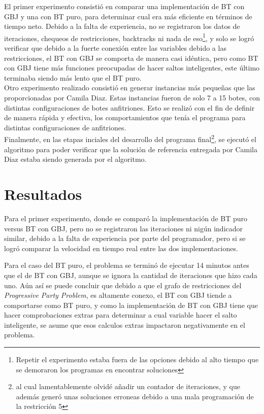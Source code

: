 \documentclass[letter, 10pt]{article}
\begin{document}
El primer experimento consistió en comparar una implementación de BT con GBJ y una con BT puro, para determinar cual era más eficiente en términos de tiempo neto. Debido a la falta de experiencia, no se registraron los datos de iteraciones, chequeos de restricciones, backtracks ni nada de eso\footnote{Repetir el experimento estaba fuera de las opciones debido al alto tiempo que se demoraron los programas en encontrar soluciones}, y solo se logró verificar que debido a la fuerte conexión entre las variables debido a las restricciones, el BT con GBJ se comporta de manera casi idéntica, pero como BT con GBJ tiene más funciones preocupadas de hacer saltos inteligentes, este último terminaba siendo más lento que el BT puro.\\

Otro experimento realizado consistió en generar instancias más pequeñas que las proporcionadas por Camila Diaz. Estas instancias fueron de solo 7 a 15 botes, con distintas configuraciones de botes anfitriones. Esto se realizó con el fin de definir de manera rápida y efectiva, los comportamientos que tenía el programa para distintas configuraciones de anfitriones.\\

Finalmente, en las etapas inciales del desarrollo del programa final\footnote{al cual lamentablemente olvidé añadir un contador de iteraciones, y que además generó unas soluciones erroneas debido a una mala programación de la restricción 5}, se ejecutó el algoritmo para poder verificar que la solución de referencia entregada por Camila Diaz estaba siendo generada por el algoritmo.

\section{Resultados}
Para el primer experimento, donde se comparó la implementación de BT puro versus BT con GBJ, pero no se registraron las iteraciones ni nigún indicador similar, debido a la falta de experiencia por parte del programador, pero si se logró comparar la velocidad en tiempo real entre las dos implementaciones.

Para el caso del BT puro, el problema se terminó de ejecutar 14 minutos antes que el de BT con GBJ, aunque se ignora la cantidad de iteraciones que hizo cada uno. Aún así se puede concluir que debido a que el grafo de restricciones del \textit{Progressive Party Problem}, es altamente conexo, el BT con GBJ tiende a comportarse como BT puro, y como la implementación de BT con GBJ tiene que hacer comprobaciones extras para determinar a cual variable hacer el salto inteligente, se asume que esos calculos extras impactaron negativamente en el problema.
\end{document}
